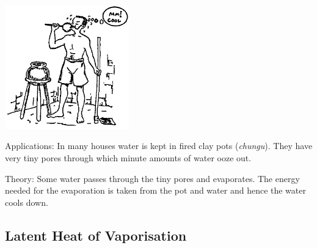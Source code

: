 \begin{multicols}{2}
\begin{center}
\includegraphics[width=0.4\textwidth]{./img/source/cooling-water.png}
\end{center}

\begin{description*}
\item[Applications:]{In many houses water is kept in fired clay pots (\emph{chungu}). They have very tiny pores through which minute amounts of water ooze out.}
\item[Theory:]{Some water passes through the tiny pores and evaporates. The energy needed for the evaporation is taken from the pot and water and hence the water cools down.}
\end{description*}

\subsection{Latent Heat of Vaporisation}



\end{multicols}
